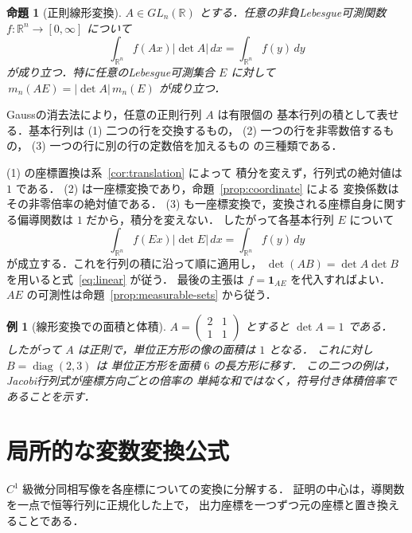 \documentclass[a5paper,10pt,onecolumn]{jsarticle}
\makeatletter
\theoremstyle{mathnotetheorem}
\newtheorem{proposition}[theorem]{命題}
\newtheorem{example}[theorem]{例}
\renewcommand{\proofname}{証明}
\renewenvironment{proof}[1][\proofname]{%
  \par\pushQED{\qed}\normalfont\topsep4\p@\@plus2\p@\relax
  \trivlist\item[\hskip\labelsep\bfseries #1]\ignorespaces
}{\popQED\endtrivlist\@endpefalse}
\newcommand{\R}{\mathbb{R}}
\newcommand{\abs}[1]{\lvert #1\rvert}
\makeatother
\begin{document}
\begin{proposition}[正則線形変換]\label{prop:linear}
$A\in GL_n(\R)$ とする．任意の非負Lebesgue可測関数
$f:\R^n\to[0,\infty]$ について
\begin{equation}\label{eq:linear}
 \int_{\R^n}f(Ax)\abs{\det A}\,dx
 =\int_{\R^n}f(y)\,dy
\end{equation}
が成り立つ．特に任意のLebesgue可測集合 $E$ に対して
$\,m_n(AE)=\abs{\det A}\,m_n(E)$ が成り立つ．
\end{proposition}

\begin{proof}
Gaussの消去法により，任意の正則行列 $A$ は有限個の
基本行列の積として表せる．基本行列は
(1) 二つの行を交換するもの，
(2) 一つの行を非零数倍するもの，
(3) 一つの行に別の行の定数倍を加えるもの
の三種類である．

(1) の座標置換は系~\ref{cor:translation} によって
積分を変えず，行列式の絶対値は $1$ である．
(2) は一座標変換であり，命題~\ref{prop:coordinate} による
変換係数はその非零倍率の絶対値である．
(3) も一座標変換で，変換される座標自身に関する偏導関数は
$1$ だから，積分を変えない．
したがって各基本行列 $E$ について
\[
 \int_{\R^n}f(Ex)\abs{\det E}\,dx
 =\int_{\R^n}f(y)\,dy
\]
が成立する．これを行列の積に沿って順に適用し，
$\det(AB)=\det A\det B$ を用いると式~\eqref{eq:linear} が従う．
最後の主張は $f=\mathbf1_{AE}$ を代入すればよい．
$AE$ の可測性は命題~\ref{prop:measurable-sets} から従う．
\end{proof}

\begin{example}[線形変換での面積と体積]
$A=\begin{pmatrix}2&1\\1&1\end{pmatrix}$ とすると $\det A=1$ である．
したがって $A$ は正則で，単位正方形の像の面積は $1$ となる．
これに対し $B=\operatorname{diag}(2,3)$ は
単位正方形を面積 $6$ の長方形に移す．
この二つの例は，Jacobi行列式が座標方向ごとの倍率の
単純な和ではなく，符号付き体積倍率であることを示す．
\end{example}

\section{局所的な変数変換公式}\label{sec:local}

$C^1$ 級微分同相写像を各座標についての変換に分解する．
証明の中心は，導関数を一点で恒等行列に正規化した上で，
出力座標を一つずつ元の座標と置き換えることである．
\end{document}
